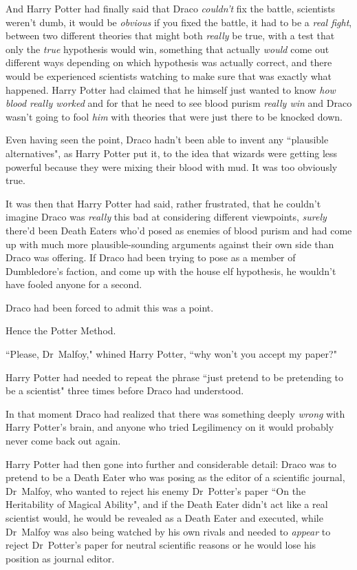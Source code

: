 And Harry Potter had finally said that Draco \emph{couldn't} fix the battle, scientists weren't dumb, it would be \emph{obvious} if you fixed the battle, it had to be a \emph{real fight}, between two different theories that might both \emph{really} be true, with a test that only the \emph{true} hypothesis would win, something that actually \emph{would} come out different ways depending on which hypothesis was actually correct, and there would be experienced scientists watching to make sure that was exactly what happened. Harry Potter had claimed that he himself just wanted to know \emph{how blood really worked} and for that he need to see blood purism \emph{really win} and Draco wasn't going to fool \emph{him} with theories that were just there to be knocked down.

Even having seen the point, Draco hadn't been able to invent any ``plausible alternatives", as Harry Potter put it, to the idea that wizards were getting less powerful because they were mixing their blood with mud. It was too obviously true.

It was then that Harry Potter had said, rather frustrated, that he couldn't imagine Draco was \emph{really} this bad at considering different viewpoints, \emph{surely} there'd been Death Eaters who'd posed as enemies of blood purism and had come up with much more plausible-sounding arguments against their own side than Draco was offering. If Draco had been trying to pose as a member of Dumbledore's faction, and come up with the house elf hypothesis, he wouldn't have fooled anyone for a second.

Draco had been forced to admit this was a point.

Hence the Potter Method.

``Please, Dr~Malfoy," whined Harry Potter, ``why won't you accept my paper?"

Harry Potter had needed to repeat the phrase ``just pretend to be pretending to be a scientist" three times before Draco had understood.

In that moment Draco had realized that there was something deeply \emph{wrong} with Harry Potter's brain, and anyone who tried Legilimency on it would probably never come back out again.

Harry Potter had then gone into further and considerable detail: Draco was to pretend to be a Death Eater who was posing as the editor of a scientific journal, Dr~Malfoy, who wanted to reject his enemy Dr~Potter's paper ``On the Heritability of Magical Ability", and if the Death Eater didn't act like a real scientist would, he would be revealed as a Death Eater and executed, while Dr~Malfoy was also being watched by his own rivals and needed to \emph{appear} to reject Dr~Potter's paper for neutral scientific reasons or he would lose his position as journal editor.

